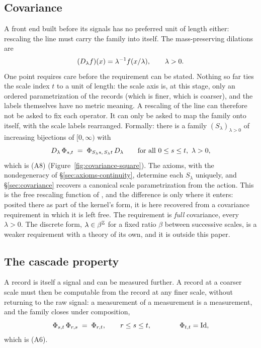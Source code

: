 \subsection{Covariance}\label{sec:axioms-covariance}

A front end built before its signals has no preferred unit of length either: rescaling
the line must carry the family into itself. The mass-preserving dilations are
\[
  (D_{\lambda}f)(x) = \lambda^{-1}f(x/\lambda), \qquad \lambda > 0 .
\]
One point requires care before the requirement can be stated. Nothing so far ties the scale
index $t$ to a unit of length: the scale axis is, at this stage, only an ordered
parametrization of the records (which is finer, which is coarser), and the labels
themselves have no metric meaning. A rescaling of the line can therefore not be asked to
fix each operator. It can only be asked to map the family onto itself, with the scale
labels rearranged. Formally: there is a family $(S_\lambda)_{\lambda > 0}$ of increasing
bijections of $[0,\infty)$ with
\[
  D_{\lambda}\,\Phi_{s,t} \;=\; \Phi_{S_\lambda s,\,S_\lambda t}\,D_{\lambda}
  \qquad \text{for all } 0 \le s \le t,\ \lambda > 0,
\]
which is (A8) (Figure~\ref{fig:covariance-square}). The axioms, with the nondegeneracy of
\S\ref{sec:axioms-continuity}, determine each $S_\lambda$ uniquely, and
\S\ref{sec:covariance} recovers a canonical scale parametrization from the action. This is
the free rescaling function of , and the difference is only
where it enters: posited there as part of the kernel's form, it is here recovered from a
covariance requirement in which it is left free. The requirement is \emph{full} covariance, every
$\lambda > 0$. The discrete form, $\lambda \in \beta^{\mathbb{Z}}$ for a fixed ratio $\beta$ between
successive scales, is a weaker requirement with a theory of its own, and it is
outside this paper.



\subsection{The cascade property}\label{sec:axioms-cascade}

A record is itself a signal and can be measured further. A record at a coarser scale must
then be computable from the record at any finer scale, without returning to the raw
signal: a measurement of a measurement is a measurement, and the family closes under
composition,
\[
  \Phi_{s,t}\,\Phi_{r,s} \;=\; \Phi_{r,t}, \qquad r \le s \le t,
  \qquad\qquad \Phi_{t,t} = \mathrm{Id},
\]
which is (A6).

